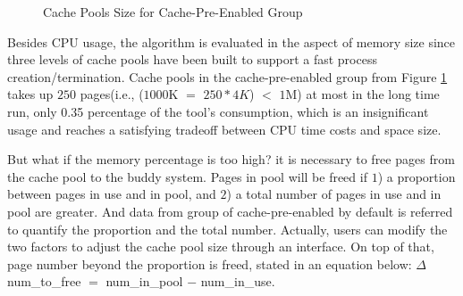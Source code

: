 \begin{figure}
\centering
{}
\hspace{1in} 
\hspace{1in} 
\caption{Cache Pools Size for Cache-Pre-Enabled Group}
\label{fig:prePGpool} %
\end{figure}

Besides CPU usage, the algorithm is evaluated in the aspect of memory size since three levels of cache pools have been built to support a fast process creation/termination. Cache pools in the cache-pre-enabled group from Figure \ref{fig:prePGpool} takes up $250$ pages(i.e., ($1000$K $=$ $250 * 4K$) $<$ $1$M) at most in the long time run, only 0.35 percentage of the tool's consumption, which is an insignificant usage and reaches a satisfying tradeoff between CPU time costs and space size.

But what if the memory percentage is too high? it is necessary to free pages from the cache pool to the buddy system. Pages in pool will be freed if $1$) a proportion between pages in use and in pool, and $2$) a total number of pages in use and in pool are greater. And data from group of cache-pre-enabled by default is referred to quantify the proportion and the total number. Actually, users can modify the two factors to adjust the cache pool size through an interface. On top of that, page number beyond the proportion is freed, stated in an equation below: $\Delta$num\_to\_free $=$ num\_in\_pool $-$ num\_in\_use.

